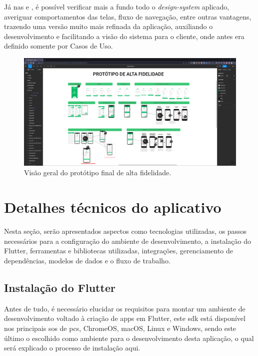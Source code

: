 Já nas  e , é possível verificar mais a fundo todo o \textit{design-system} aplicado, averiguar comportamentos das telas, fluxo de navegação, entre outras vantagens, trazendo uma versão muito mais refinada da aplicação, auxiliando o desenvolvimento e facilitando a visão do sistema para o cliente, onde antes era definido somente por Casos de Uso.

\begin{figure}[H]
\centering
  \includegraphics[width=\columnwidth]{images/prototipo_alta.png}
  \caption{Visão geral do protótipo final de alta fidelidade.}
  \label{fig:prototipo_alta}
\end{figure}


\section{Detalhes técnicos do aplicativo}\label{sec:detalhes_tec}
Nesta seção, serão apresentados aspectos como tecnologias utilizadas, os passos necessários para a configuração do ambiente de desenvolvimento, a instalação do Flutter, ferramentas e bibliotecas utilizadas, integrações, gerenciamento de dependências, modelos de dados e o fluxo de trabalho.

\subsection{Instalação do Flutter}\label{ssec:instalacao_flutter}
Antes de tudo, é necessário elucidar os requisitos para montar um ambiente de desenvolvimento voltado à criação de \acp{app} em Flutter, este \ac{sdk} está disponível nos principais \acp{so} de \acp{pc}, ChromeOS, macOS, Linux e Windows, sendo este último o escolhido como ambiente para o desenvolvimento desta aplicação, o qual será explicado o processo de instalação aqui.

